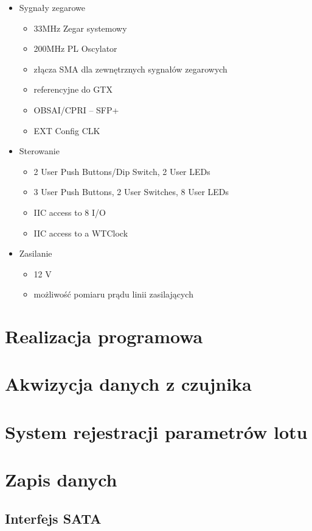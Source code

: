 \documentclass[a4paper,11pt,oneside]{book}  %
\begin{document}
\begin{itemize}
\item Sygnały zegarowe
	\begin{itemize}
	\item 33MHz Zegar systemowy
	\item 200MHz PL Oscylator
	\item złącza SMA dla zewnętrznych sygnałów zegarowych
	\item referencyjne do GTX 
	\item OBSAI/CPRI – SFP+ 
	\item EXT Config CLK
	\end{itemize}

\item Sterowanie
	\begin{itemize}
	\item 2 User Push Buttons/Dip Switch, 2 User LEDs
	\item 3 User Push Buttons, 2 User Switches, 8 User LEDs
	\item IIC access to 8 I/O
	\item IIC access to a WTClock
	\end{itemize}

\item Zasilanie
	\begin{itemize}
	\item 12 V 
	\item możliwość pomiaru prądu linii zasilających
	\end{itemize}
\end{itemize}

\section{Realizacja programowa}

\section{Akwizycja danych z czujnika}

\section{System rejestracji parametrów lotu}

\section{Zapis danych}

\subsection{Interfejs SATA}
\end{document}
